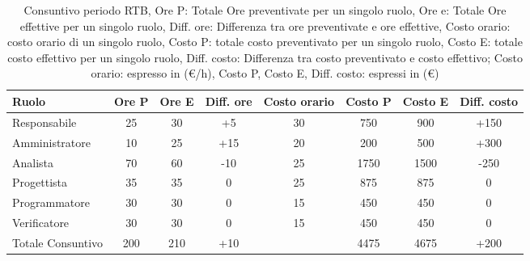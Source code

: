 \begin{table}[H]
	\centering
	\begin{tabular}{l|c|c|c|c|c|c|c}
		\textbf{Ruolo}         & \textbf{Ore P} & \textbf{Ore E} & \textbf{Diff. ore} & \textbf{Costo orario} & \textbf{Costo P} &\textbf{Costo E} & \textbf{Diff. costo}  \\
		\hline
		Responsabile            & 25                     & 30             & +5                    & 30                   & 750           & 900                     & +150              \\
		Amministratore          & 10                     & 25             & +15                   & 20                   & 200           & 500                     & +300              \\
		Analista                & 70                     & 60             & -10                   & 25                   & 1750           & 1500                   & -250              \\
		Progettista             & 35                     & 35             & 0                     & 25                   & 875           & 875                     & 0              \\
		Programmatore           & 30                     & 30             & 0                     & 15                   & 450           & 450                     & 0              \\
		Verificatore            & 30                     & 30             & 0                     & 15                   & 450           & 450                     & 0              \\
        \hline
        Totale Consuntivo       & 200                    & 210            & +10                   &                      & 4475          & 4675                    & +200              \\
		\hline
	\end{tabular}
	\caption{Consuntivo periodo RTB, Ore P: Totale Ore preventivate per un singolo ruolo, Ore e: Totale Ore effettive per un singolo ruolo, 
            Diff. ore: Differenza tra ore preventivate e ore effettive, Costo orario: costo orario di un singolo ruolo, Costo P: totale costo preventivato per un singolo ruolo, 
            Costo E: totale costo effettivo per un singolo ruolo,  Diff. costo: Differenza tra costo preventivato e costo effettivo;
            Costo orario: espresso in (\euro/h), Costo P, Costo E, Diff. costo: espressi in (\euro)}  
\end{table}






